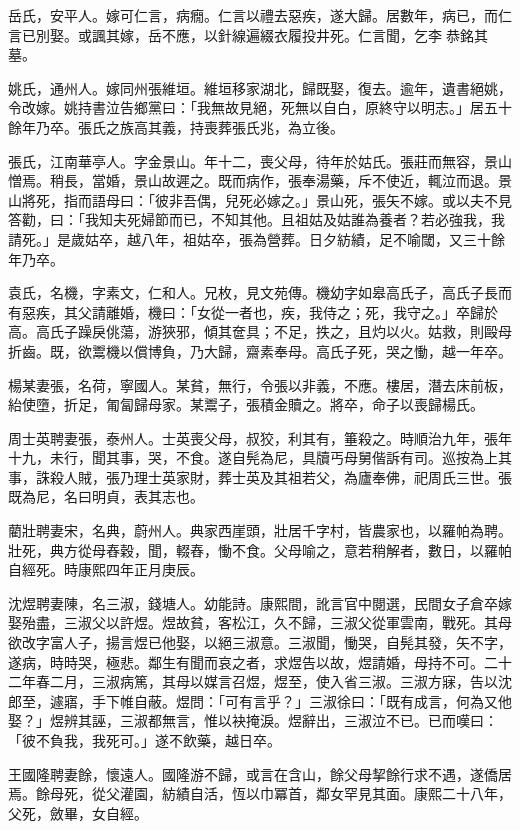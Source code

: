 \begin{pinyinscope}
岳氏，安平人。嫁可仁言，病癇。仁言以禮去惡疾，遂大歸。居數年，病已，而仁言已別娶。或諷其嫁，岳不應，以針線遍綴衣履投井死。仁言聞，乞李恭銘其墓。

姚氏，通州人。嫁同州張維垣。維垣移家湖北，歸既娶，復去。逾年，遺書絕姚，令改嫁。姚持書泣告鄉黨曰：「我無故見絕，死無以自白，原終守以明志。」居五十餘年乃卒。張氏之族高其義，持喪葬張氏兆，為立後。

張氏，江南華亭人。字金景山。年十二，喪父母，待年於姑氏。張莊而無容，景山憎焉。稍長，當婚，景山故遲之。既而病作，張奉湯藥，斥不使近，輒泣而退。景山將死，指而語母曰：「彼非吾偶，兒死必嫁之。」景山死，張矢不嫁。或以夫不見答勸，曰：「我知夫死婦節而已，不知其他。且祖姑及姑誰為養者？若必強我，我請死。」是歲姑卒，越八年，祖姑卒，張為營葬。日夕紡績，足不喻閾，又三十餘年乃卒。

袁氏，名機，字素文，仁和人。兄枚，見文苑傳。機幼字如皋高氏子，高氏子長而有惡疾，其父請離婚，機曰：「女從一者也，疾，我侍之；死，我守之。」卒歸於高。高氏子躁戾佻蕩，游狹邪，傾其奩具；不足，抶之，且灼以火。姑救，則毆母折齒。既，欲鬻機以償博負，乃大歸，齋素奉母。高氏子死，哭之慟，越一年卒。

楊某妻張，名荷，寧國人。某貧，無行，令張以非義，不應。樓居，潛去床前板，紿使墮，折足，匍匐歸母家。某鬻子，張積金贖之。將卒，命子以喪歸楊氏。

周士英聘妻張，泰州人。士英喪父母，叔狡，利其有，箠殺之。時順治九年，張年十九，未行，聞其事，哭，不食。遂自髡為尼，具牘丐母舅偕訴有司。巡按為上其事，誅殺人賊，張乃理士英家財，葬士英及其祖若父，為廬奉佛，祀周氏三世。張既為尼，名曰明貞，表其志也。

藺壯聘妻宋，名典，蔚州人。典家西崖頭，壯居千字村，皆農家也，以羅帕為聘。壯死，典方從母舂穀，聞，輟舂，慟不食。父母喻之，意若稍解者，數日，以羅帕自經死。時康熙四年正月庚辰。

沈煜聘妻陳，名三淑，錢塘人。幼能詩。康熙間，訛言官中閱選，民間女子倉卒嫁娶殆盡，三淑父以許煜。煜故貧，客松江，久不歸，三淑父從軍雲南，戰死。其母欲改字富人子，揚言煜已他娶，以絕三淑意。三淑聞，慟哭，自髡其發，矢不字，遂病，時時哭，極悲。鄰生有聞而哀之者，求煜告以故，煜請婚，母持不可。二十二年春二月，三淑病篤，其母以媒言召煜，煜至，使入省三淑。三淑方寐，告以沈郎至，遽寤，手下帷自蔽。煜問：「可有言乎？」三淑徐曰：「既有成言，何為又他娶？」煜辨其誣，三淑都無言，惟以袂掩淚。煜辭出，三淑泣不已。已而嘆曰：「彼不負我，我死可。」遂不飲藥，越日卒。

王國隆聘妻餘，懷遠人。國隆游不歸，或言在含山，餘父母挈餘行求不遇，遂僑居焉。餘母死，從父灌園，紡績自活，恆以巾冪首，鄰女罕見其面。康熙二十八年，父死，斂畢，女自經。


\end{pinyinscope}
